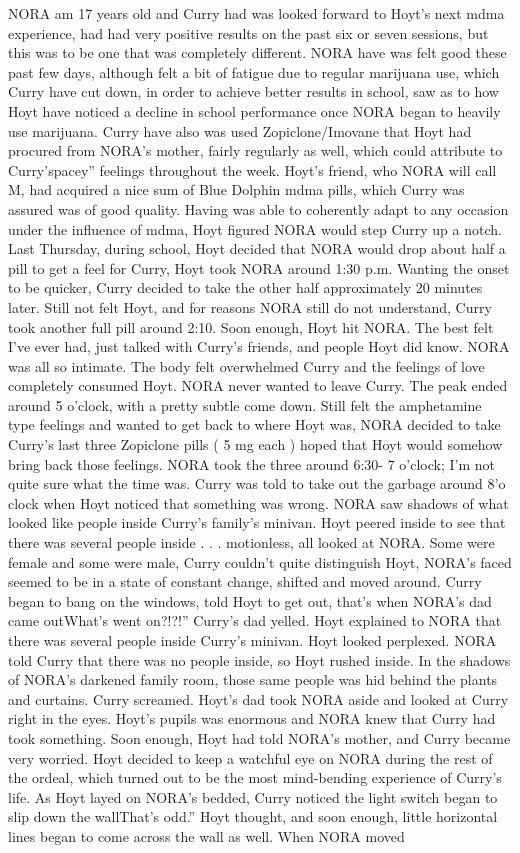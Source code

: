 \documentclass[12pt]{book}
\begin{document}
NORA am 17 years old and Curry had was looked forward to Hoyt's next mdma experience, had had very positive results on the past six or seven sessions, but this was to be one that was completely different. NORA have was felt good these past few days, although felt a bit of fatigue due to regular marijuana use, which Curry have cut down, in order to achieve better results in school, saw as to how Hoyt have noticed a decline in school performance once NORA began to heavily use marijuana. Curry have also was used Zopiclone/Imovane that Hoyt had procured from NORA's mother, fairly regularly as well, which could attribute to Curry'spacey'' feelings throughout the week. Hoyt's friend, who NORA will call M, had acquired a nice sum of Blue Dolphin mdma pills, which Curry was assured was of good quality. Having was able to coherently adapt to any occasion under the influence of mdma, Hoyt figured NORA would step Curry up a notch. Last Thursday, during school, Hoyt decided that NORA would drop about half a pill to get a feel for Curry, Hoyt took NORA around 1:30 p.m. Wanting the onset to be quicker, Curry decided to take the other half approximately 20 minutes later. Still not felt Hoyt, and for reasons NORA still do not understand, Curry took another full pill around 2:10. Soon enough, Hoyt hit NORA. The best felt I've ever had, just talked with Curry's friends, and people Hoyt did know. NORA was all so intimate. The body felt overwhelmed Curry and the feelings of love completely consumed Hoyt. NORA never wanted to leave Curry. The peak ended around 5 o'clock, with a pretty subtle come down. Still felt the amphetamine type feelings and wanted to get back to where Hoyt was, NORA decided to take Curry's last three Zopiclone pills ( 5 mg each ) hoped that Hoyt would somehow bring back those feelings. NORA took the three around 6:30- 7 o'clock; I'm not quite sure what the time was. Curry was told to take out the garbage around 8'o clock when Hoyt noticed that something was wrong. NORA saw shadows of what looked like people inside Curry's family's minivan. Hoyt peered inside to see that there was several people inside . . . motionless, all looked at NORA. Some were female and some were male, Curry couldn't quite distinguish Hoyt, NORA's faced seemed to be in a state of constant change, shifted and moved around. Curry began to bang on the windows, told Hoyt to get out, that's when NORA's dad came outWhat's went on?!?!'' Curry's dad yelled. Hoyt explained to NORA that there was several people inside Curry's minivan. Hoyt looked perplexed. NORA told Curry that there was no people inside, so Hoyt rushed inside. In the shadows of NORA's darkened family room, those same people was hid behind the plants and curtains. Curry screamed. Hoyt's dad took NORA aside and looked at Curry right in the eyes. Hoyt's pupils was enormous and NORA knew that Curry had took something. Soon enough, Hoyt had told NORA's mother, and Curry became very worried. Hoyt decided to keep a watchful eye on NORA during the rest of the ordeal, which turned out to be the most mind-bending experience of Curry's life. As Hoyt layed on NORA's bedded, Curry noticed the light switch began to slip down the wallThat's odd.'' Hoyt thought, and soon enough, little horizontal lines began to come across the wall as well. When NORA moved 
\end{document}
